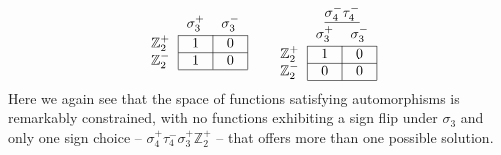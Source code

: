 \documentclass[11pt]{article}
\begin{document}
\begin{equation}
\begin{tabular}{ c | c | c |}
\multicolumn{1}{c}{} & \multicolumn{1}{c}{$\sigma_{3}^+$} & \multicolumn{1}{c}{$\sigma_{3}^-$} \\[-1em]
\multicolumn{1}{c}{} & \multicolumn{1}{c}{} & \multicolumn{1}{c}{} \\
\cline{2-3} $\mathbb{Z}_2^+$ & 1 & 0 \\
\cline{2-3} $\mathbb{Z}_2^-$ & 1 & 0 \\
\cline{2-3}
\end{tabular}
\hspace{.6cm}
\begin{tabular}{ c | c | c |}
\multicolumn{1}{c}{} &\multicolumn{2}{c}{$\underline{\sigma_4^- \tau_4^-}$} \\[-1em]
\multicolumn{1}{c}{} & \multicolumn{1}{c}{} & \multicolumn{1}{c}{}\\
\multicolumn{1}{c}{} & \multicolumn{1}{c}{$\sigma_{3}^+$} & \multicolumn{1}{c}{$\sigma_{3}^-$} \\[-1em]
\multicolumn{1}{c}{} & \multicolumn{1}{c}{} & \multicolumn{1}{c}{} \\
\cline{2-3} $\mathbb{Z}_2^+$ & 1 & 0 \\
\cline{2-3} $\mathbb{Z}_2^-$ & 0 & 0 \\
\cline{2-3}
\end{tabular}
\end{equation}
Here we again see that the space of functions satisfying automorphisms is remarkably constrained, with no functions exhibiting a sign flip under $\sigma_3$ and only one sign choice -- $\sigma_4^+\tau_4^-\sigma_3^+\mathbb{Z}_2^+$ -- that offers more than one possible solution.
\end{document}
